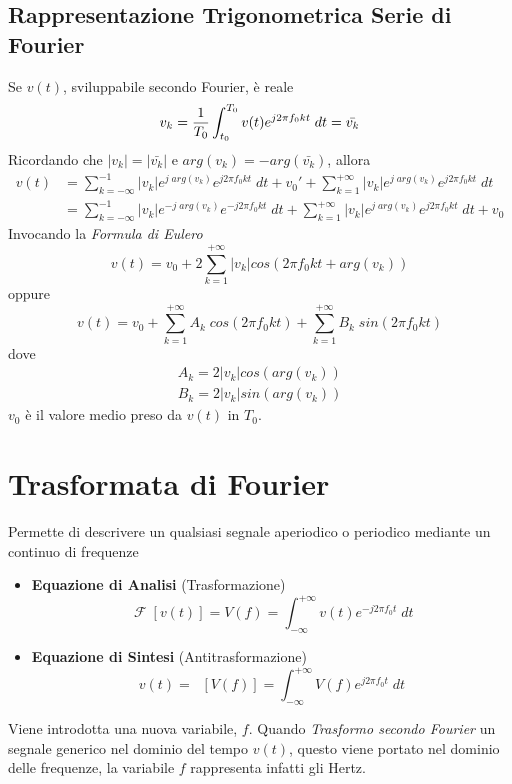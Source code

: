 \documentclass{article}
\newcommand{\Fourier}{\mathop{\mathcal{F}}}
\newcommand{\AntiFourier}{\mathop{\mathcal{F}^{-1}}}
\begin{document}
		\subsection{Rappresentazione Trigonometrica Serie di Fourier}
			Se $ v(t) $, sviluppabile secondo Fourier, è reale
			\[
				v_k = {1\over{T_0}} \int_{t_0}^{T_0} {v(t) e^{j2\pi f_0 kt}\; dt} = \bar{v_k}
			\]
			Ricordando che $ \vert v_k \vert = \vert \bar{v_k} \vert $ e $ arg(v_k) = -arg(\bar{v_k}) $, allora
			\[
				\begin{aligned}
					v(t) &= \sum_{k=-\infty}^{-1} {\vert v_k \vert e^{j\; arg(v_k)} e^{j2\pi f_0 kt}\; dt} + v_0' + \sum_{k=1}^{+\infty} {\vert v_k \vert e^{j\; arg(v_k)} e^{j2\pi f_0 kt}\; dt} \\
					&= \sum_{k=-\infty}^{-1} {\vert v_k \vert e^{-j\; arg(v_k)} e^{-j2\pi f_0 kt}\; dt} + \sum_{k=1}^{+\infty} {\vert v_k \vert e^{j\; arg(v_k)} e^{j2\pi f_0 kt}\; dt} + v_0
				\end{aligned}
			\]
			Invocando la \textit{Formula di Eulero}
			\[
				v(t) = v_0 + 2\sum_{k=1}^{+\infty} {\vert v_k \vert cos(2\pi f_0 kt + arg(v_k))}
			\]
			oppure
			\[
				v(t) = v_0 + \sum_{k=1}^{+\infty} {A_k\; cos(2\pi f_0 kt)} + \sum_{k=1}^{+\infty} {B_k\; sin(2\pi f_0 kt)}
			\]
			dove
			\[
				\begin{gathered}
					A_k = 2\vert v_k \vert cos(arg(v_k)) \\
					B_k = 2\vert v_k \vert sin(arg(v_k))
				\end{gathered}
			\]
			$ v_0 $ è il valore medio preso da $ v(t) $ in $ T_0 $.

    \newpage
	\section{Trasformata di Fourier}
		Permette di descrivere un qualsiasi segnale aperiodico o periodico mediante un continuo di frequenze
		\begin{itemize}
			\item \textbf{Equazione di Analisi} (Trasformazione)
				  \[
				  	\Fourier[v(t)] = V(f) = \int_{-\infty}^{+\infty} {v(t) e^{-j2\pi f_0 t}\; dt}
				  \]
			\item \textbf{Equazione di Sintesi} (Antitrasformazione)
				  \[
				  	v(t) = \AntiFourier[V(f)] = \int_{-\infty}^{+\infty} {V(f) e^{j2\pi f_0 t}\; dt}
				  \]
		\end{itemize}
		Viene introdotta una nuova variabile, $ f $. Quando \textit{Trasformo secondo Fourier} un segnale generico nel dominio del tempo $ v(t) $, questo viene portato nel dominio delle frequenze, la variabile $ f $ rappresenta infatti gli Hertz.
\end{document}
